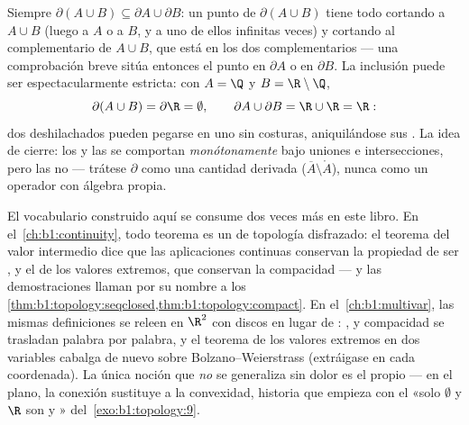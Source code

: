 \begin{example}\label{ex:b1:topology:boundaryunion}
Siempre $\partial(A \cup B) \subseteq \partial A \cup \partial B$: un
punto de $\partial(A \cup B)$ tiene todo  cortando a
$A \cup B$ (luego a $A$ o a $B$, y a uno de ellos infinitas veces) y
cortando al complementario de $A \cup B$, que está en los dos
complementarios --- una comprobación breve sitúa entonces el punto en
$\partial A$ o en $\partial B$. La inclusión puede ser
espectacularmente estricta: con $A = \Q$ y $B = \R\setminus\Q$,
\[
\partial(A \cup B) = \partial \R = \emptyset ,
\qquad
\partial A \cup \partial B = \R \cup \R = \R :
\]
dos  deshilachados pueden pegarse en uno sin costuras,
aniquilándose sus . La idea de cierre: los  y las
 se comportan \emph{monótonamente} bajo uniones e
intersecciones, pero las  no --- trátese $\partial$ como una
cantidad derivada ($\overline A \setminus \mathring A$), nunca como un
operador con álgebra propia.
\end{example}

\begin{remark}
El vocabulario construido aquí se consume dos veces más en este libro.
En el~\cref{ch:b1:continuity}, todo teorema es un  de
topología disfrazado: el teorema del valor intermedio dice que las
aplicaciones continuas conservan la propiedad de ser , y el
de los valores extremos, que conservan la compacidad --- y las
demostraciones llaman por su nombre a los
\cref{thm:b1:topology:seqclosed,thm:b1:topology:compact}. En
el~\cref{ch:b1:multivar}, las mismas definiciones se releen en $\R^2$
con discos en lugar de : ,  y compacidad
se trasladan palabra por palabra, y el teorema de los valores extremos
en dos variables cabalga de nuevo sobre Bolzano--Weierstrass
(extráigase en cada coordenada). La única noción que \emph{no} se
generaliza sin dolor es el propio  --- en el plano, la
conexión sustituye a la convexidad, historia que empieza con el «solo
$\emptyset$ y $\R$ son  y »
del~\cref{exo:b1:topology:9}.
\end{remark}

